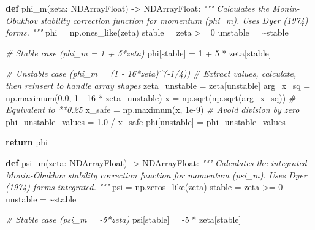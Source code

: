 \documentclass[
]{article}
\newenvironment{Shaded}{}{}
\newcommand{\CommentTok}[1]{\textcolor[rgb]{0.38,0.63,0.69}{\textit{#1}}}
\newcommand{\ControlFlowTok}[1]{\textcolor[rgb]{0.00,0.44,0.13}{\textbf{#1}}}
\newcommand{\DecValTok}[1]{\textcolor[rgb]{0.25,0.63,0.44}{#1}}
\newcommand{\FloatTok}[1]{\textcolor[rgb]{0.25,0.63,0.44}{#1}}
\newcommand{\KeywordTok}[1]{\textcolor[rgb]{0.00,0.44,0.13}{\textbf{#1}}}
\newcommand{\NormalTok}[1]{#1}
\newcommand{\OperatorTok}[1]{\textcolor[rgb]{0.40,0.40,0.40}{#1}}
\begin{document}
\begin{Shaded}
\begin{Highlighting}[]
\KeywordTok{def}\NormalTok{ phi\_m(zeta: NDArrayFloat) }\OperatorTok{{-}\textgreater{}}\NormalTok{ NDArrayFloat:}
    \CommentTok{"""}
\CommentTok{    Calculates the Monin{-}Obukhov stability correction function for momentum (phi\_m).}
\CommentTok{    Uses Dyer (1974) forms.}
\CommentTok{    """}
\NormalTok{    phi }\OperatorTok{=}\NormalTok{ np.ones\_like(zeta)}
\NormalTok{    stable }\OperatorTok{=}\NormalTok{ zeta }\OperatorTok{\textgreater{}=} \DecValTok{0}
\NormalTok{    unstable }\OperatorTok{=} \OperatorTok{\textasciitilde{}}\NormalTok{stable}

    \CommentTok{\# Stable case (phi\_m = 1 + 5*zeta)}
\NormalTok{    phi[stable] }\OperatorTok{=} \DecValTok{1} \OperatorTok{+} \DecValTok{5} \OperatorTok{*}\NormalTok{ zeta[stable]}

    \CommentTok{\# Unstable case (phi\_m = (1 {-} 16*zeta)\^{}({-}1/4))}
    \CommentTok{\# Extract values, calculate, then reinsert to handle array shapes}
\NormalTok{    zeta\_unstable }\OperatorTok{=}\NormalTok{ zeta[unstable]}
\NormalTok{    arg\_x\_sq }\OperatorTok{=}\NormalTok{ np.maximum(}\FloatTok{0.0}\NormalTok{, }\DecValTok{1} \OperatorTok{{-}} \DecValTok{16} \OperatorTok{*}\NormalTok{ zeta\_unstable)}
\NormalTok{    x }\OperatorTok{=}\NormalTok{ np.sqrt(np.sqrt(arg\_x\_sq))  }\CommentTok{\# Equivalent to **0.25}
\NormalTok{    x\_safe }\OperatorTok{=}\NormalTok{ np.maximum(x, }\FloatTok{1e{-}9}\NormalTok{)    }\CommentTok{\# Avoid division by zero}
\NormalTok{    phi\_unstable\_values }\OperatorTok{=} \FloatTok{1.0} \OperatorTok{/}\NormalTok{ x\_safe}
\NormalTok{    phi[unstable] }\OperatorTok{=}\NormalTok{ phi\_unstable\_values}

    \ControlFlowTok{return}\NormalTok{ phi}

\KeywordTok{def}\NormalTok{ psi\_m(zeta: NDArrayFloat) }\OperatorTok{{-}\textgreater{}}\NormalTok{ NDArrayFloat:}
    \CommentTok{"""}
\CommentTok{    Calculates the integrated Monin{-}Obukhov stability correction function for momentum (psi\_m).}
\CommentTok{    Uses Dyer (1974) forms integrated.}
\CommentTok{    """}
\NormalTok{    psi }\OperatorTok{=}\NormalTok{ np.zeros\_like(zeta)}
\NormalTok{    stable }\OperatorTok{=}\NormalTok{ zeta }\OperatorTok{\textgreater{}=} \DecValTok{0}
\NormalTok{    unstable }\OperatorTok{=} \OperatorTok{\textasciitilde{}}\NormalTok{stable}

    \CommentTok{\# Stable case (psi\_m = {-}5*zeta)}
\NormalTok{    psi[stable] }\OperatorTok{=} \OperatorTok{{-}}\DecValTok{5} \OperatorTok{*}\NormalTok{ zeta[stable]}


\end{Highlighting}
\end{Shaded}
\end{document}
